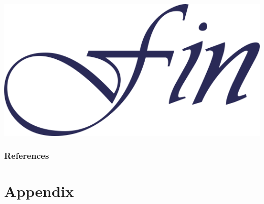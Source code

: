 \documentclass[aspectratio=169]{beamer}
\newlength{\frametextheight}
\begin{document}
\begin{frame}[plain]
    \begin{center}
        \includegraphics[height=0.7\frametextheight]{./images/fin}
    \end{center}
\end{frame}

\begin{frame}[allowframebreaks]
    \frametitle{References}
    \footnotesize
    
\end{frame}


\appendix

\section*{Appendix}
\end{document}
